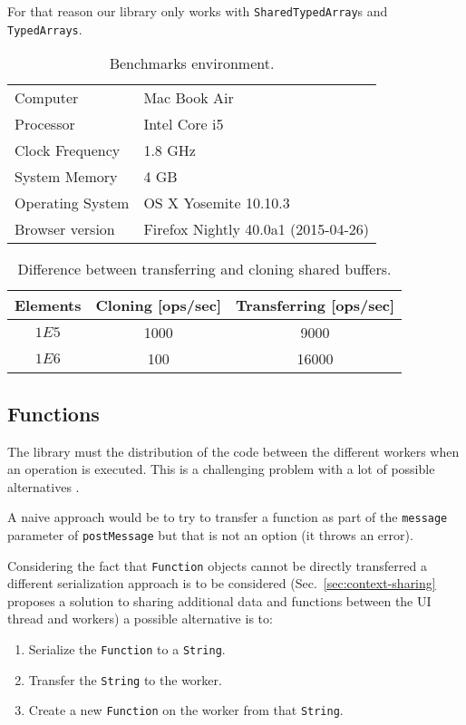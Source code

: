 \documentclass[runningheads,a4paper]{llncs}
\begin{document}
For that reason our library only works with \verb+SharedTypedArray+s and \verb+TypedArrays+.

\begin{table}
  \centering
  \begin{tabular}{|l|l|}
    \hline
    Computer & Mac Book Air \\
    Processor & Intel Core i5 \\
    Clock Frequency & 1.8 GHz \\
    System Memory & 4 GB \\
    Operating System & OS X Yosemite 10.10.3 \\
    Browser version & Firefox Nightly 40.0a1 (2015-04-26) \\
    \hline
  \end{tabular}
  \caption{Benchmarks environment.}
  \label{tab:env}
\end{table}

\begin{table}
  \centering
  \begin{tabular}{|c|c|c|}
    \hline
    Elements & Cloning [ops/sec] & Transferring [ops/sec] \\
    \hline
    \(1E5\) & 1000 & 9000 \\
    \(1E6\) & 100 & 16000 \\
    \hline
  \end{tabular}
  \caption{Difference between transferring and cloning shared buffers.}
  \label{tab:transf-vs-clone}
\end{table}

\subsection{Functions}
The library must the distribution of the code between the different workers when an operation is executed. This is a challenging problem with a lot of possible alternatives \cite{cloud-haskell} \cite{distributed-scheme}.

A naive approach would be to try to transfer a function as part of the \verb+message+ parameter of \verb+postMessage+ but that is not an option (it throws an error).

Considering the fact that \verb+Function+ objects cannot be directly transferred a different serialization approach is to be considered (Sec.~\ref{sec:context-sharing} proposes a solution to sharing additional data and functions between the UI thread and workers) a possible alternative is to:
\begin{enumerate}
  \item Serialize the \verb+Function+ to a \verb+String+.
  \item Transfer the \verb+String+ to the worker.
  \item Create a new \verb+Function+ on the worker from that \verb+String+.
\end{enumerate}
\end{document}
